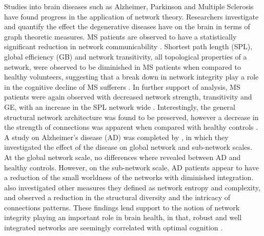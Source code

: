\documentclass[11pt]{article}
\begin{document}
Studies into brain diseases such as Alzheimer, Parkinson and Multiple Sclerosis have found progress in the application of network theory. Researchers investigate and quantify the effect the degenerative diseases have on the brain in terms of graph theoretic measures. MS patients are observed to have a statistically significant reduction in network communicability \citep{MS1}. Shortest path length (SPL), global efficiency (GB) and network transitivity, all topological properties of a network, were observed to be diminished in MS patients when compared to healthy volunteers, suggesting that a break down in network integrity play a role in the cognitive decline of MS sufferers \citep{MS2}. In further support of \citet{MS2} analysis, MS patients were again observed with decreased network strength, transitivity and GE, with an increase in the SPL network wide \citep{MS3}. Interestingly, the general structural network architecture was found to be preserved, however a decrease in the strength of connections was apparent when compared with healthy controls \citep{MS3}. A study on Alzheimer's disease (AD) was completed by \citet{alz}, in which they investigated the effect of the disease on global network and sub-network scales. At the global network scale, no differences where revealed between AD and healthy controls. However, on the sub-network scale, AD patients appear to have a reduction of the small worldness of the networks with diminished integration. \citet{alz} also investigated other measures they defined as network entropy and complexity, and observed a reduction in the structural diversity and the intricacy of connections patterns. These findings lend support to the notion of network integrity playing an important role in brain health, in that, robust and well integrated networks are seemingly correlated with optimal cognition \citep{revbull}. 
\end{document}
